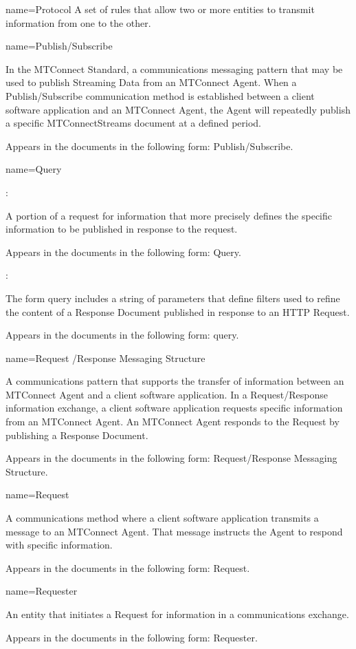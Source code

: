 {
  name={Protocol}
}
{
	A set of rules that allow two or more entities to transmit information from one to the other.
}


{
  name={Publish/Subscribe}
}
{
	In the MTConnect Standard, a communications messaging pattern that may be used to publish Streaming Data from an MTConnect Agent.  When a Publish/Subscribe communication method is established between a client software application and an MTConnect Agent, the Agent will repeatedly publish a specific MTConnectStreams document at a defined period.

	Appears in the documents in the following form: Publish/Subscribe.
}


{
  name={Query}
}
{
	:

	A portion of a request for information that more precisely defines the specific information to be published in response to the request. 

	Appears in the documents in the following form: Query.

	:

	The form query includes a string of parameters that define filters used to refine the content of a Response Document published in response to an HTTP Request.

	Appears in the documents in the following form: query.
}


{
  name={Request /Response Messaging Structure}
}
{
	A communications pattern that supports the transfer of information between an MTConnect Agent and a client software application. In a Request/Response information exchange, a client software application requests specific information from an MTConnect Agent. An MTConnect Agent responds to the Request by publishing a Response Document.   

	Appears in the documents in the following form: Request/Response Messaging Structure.
}


{
  name={Request}
}
{
	A communications method where a client software application transmits a message to an MTConnect Agent.  That message instructs the Agent to respond with specific information.

	Appears in the documents in the following form: Request.
}


{
  name={Requester}
}
{
	An entity that initiates a Request for information in a communications exchange.

	Appears in the documents in the following form: Requester.
}


